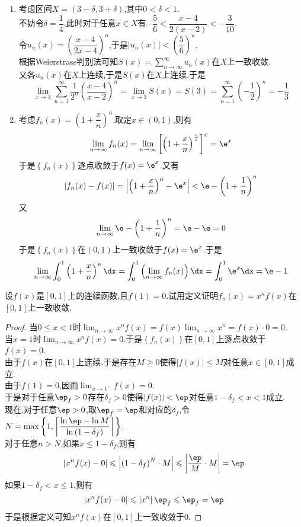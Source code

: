 \documentclass{ctexart}
\begin{document}
\begin{solution}
    \begin{enumerate}[label=\tbf{(\arabic*)}]
        \item 考虑区间$X=(3-\delta,3+\delta)$,其中$0<\delta<1$.\\
            不妨令$\delta=\dfrac14$,此时对于任意$x\in X$有$-\dfrac56<\dfrac{x-4}{2(x-2)}<-\dfrac{3}{10}$.\\
            令$u_n(x)=\left(\dfrac{x-4}{2x-4}\right)^n$,于是$\left|u_n(x)\right|<\left(\dfrac56\right)^n$.\\
            根据Weierstrass判别法可知$\displaystyle S(x)=\sum_{n\to\infty}^\infty u_n(x)$在$X$上一致收敛.\\
            又各$u_n(x)$在$X$上连续,于是$S(x)$在$X$上连续.于是
            \[\lim_{x\to3}\sum_{n=1}^{\infty}\dfrac{1}{2^n}\left(\dfrac{x-4}{x-2}\right)^n=\lim_{x\to3}S(x)=S(3)=\sum_{n=1}^\infty\left(-\dfrac12\right)^n=-\dfrac13\]
        \item 考虑$f_n(x)=\left(1+\dfrac xn\right)^n$.取定$x\in(0,1)$,则有
            \[\lim_{n\to\infty}f_n(x)=\lim_{n\to\infty}\left[\left(1+\dfrac xn\right)^{\frac nx}\right]^x=\e^x\]
            于是$\left\{f_n(x)\right\}$逐点收敛于$f(x)=\e^x$.又有
            \[\left|f_n(x)-f(x)\right|=\left|\left(1+\dfrac{x}{n}\right)^n-\e^x\right|<\e-\left(1+\dfrac{1}{n}\right)^n\]
            又
            \[\lim_{n\to\infty}\e-\left(1+\dfrac{1}{n}\right)^n=\e-\e=0\]
            于是$\left\{f_n(x)\right\}$在$(0,1)$上一致收敛于$f(x)=\e^x$.于是
            \[\lim_{n\to\infty}\int_0^1\left(1+\dfrac xn\right)^n\dx=\int_0^1\left(\lim_{n\to\infty}f_n(x)\right)\dx=\int_0^1\e^x\dx=\e-1\]
    \end{enumerate}
\end{solution}
\begin{problem}[L.10.4]
    设$f(x)$是$[0,1]$上的连续函数,且$f(1)=0$.试用定义证明$f_n(x)=x^nf(x)$在$[0,1]$上一致收敛.
\end{problem}
\begin{proof}
    当$0\leqslant x<1$时$\displaystyle\lim_{n\to\infty}x^nf(x)=f(x)\lim_{n\to\infty}x^n=f(x)\cdot0=0$.\\
    当$x=1$时$\displaystyle\lim_{n\to\infty}x^nf(x)=0$.于是$\left\{f_n(x)\right\}$在$[0,1]$上逐点收敛于$f(x)=0$.\\
    由于$f(x)$在$[0,1]$上连续,于是存在$M\geqslant0$使得$\left|f(x)\right|\leqslant M$对任意$x\in[0,1]$成立.\\
    由于$f(1)=0$,因而$\displaystyle\lim_{x\to1^-}f(x)=0$.\\
    于是对于任意$\ep_f>0$存在$\delta_f>0$使得$\left|f(x)\right|<\ep$对任意$1-\delta_f<x<1$成立.\\
    现在,对于任意$\ep>0$,取$\ep_f=\ep$和对应的$\delta _f$,令$\displaystyle N=\max\left\{1,\left\lceil\dfrac{\ln\ep-\ln M}{\ln\left(1-\delta_f\right)}\right\rceil \right\}$.\\
    对于任意$n>N$,如果$x\leqslant1-\delta_f$,则有
    \[\left|x^nf(x)-0\right|\leqslant\left|\left(1-\delta_f\right)^N\cdot M\right|\leqslant\left|\dfrac{\ep}{M}\cdot M\right|=\ep\]
    如果$1-\delta_f<x\leqslant1$,则有
    \[\left|x^nf(x)-0\right|\leqslant\left|x^n\right|\ep_f\leqslant\ep_f=\ep\]
    于是根据定义可知$x^nf(x)$在$[0,1]$上一致收敛于$0$.
\end{proof}
\end{document}
